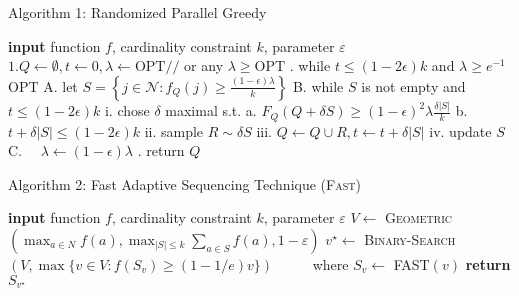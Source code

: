 \documentclass{beamer} %
\begin{document}
\begin{frame}{Algorithm 1: Randomized Parallel Greedy}
\begin{algorithm}[H]
\caption{Randomized Parallel Greedy}
\begin{algorithmic}
    	\STATE \textbf{input} function $f$, cardinality constraint $k$, parameter $\varepsilon$
\STATE$1 . Q \leftarrow \emptyset, t \leftarrow 0, \lambda \leftarrow \mathrm{OPT} / /$ or any $\lambda \geq \mathrm{OPT}$
. while $t \leq(1-2 \epsilon) k$ and $\lambda \geq e^{-1}$ OPT
\STATE \quad A. let $S=\left\{j \in \mathcal{N}: f_{Q}(j) \geq \frac{(1-\epsilon) \lambda}{k}\right\}$
\STATE B. while $S$ is not empty and $t \leq(1-2 \epsilon) k$
\STATE i. chose $\delta$ maximal s.t.
\STATE a. $F_{Q}(Q+\delta S) \geq(1-\epsilon)^{2} \lambda \frac{\delta|S|}{k}$
\STATE b. $t+\delta|S| \leq(1-2 \epsilon) k$
\STATE ii. sample $R \sim \delta S$
\STATE iii. $Q \leftarrow Q \cup R, t \leftarrow t+\delta|S|$
\STATE iv. update $S$
\STATE C. $\quad \lambda \leftarrow(1-\epsilon) \lambda$
. return $Q$
  \end{algorithmic}
  \label{alg:full}
\end{algorithm}


\end{frame}

\begin{frame}{Algorithm 2: Fast Adaptive Sequencing Technique (\textsc{Fast})} 
\begin{algorithm}[H]
\caption{\textsc{Fast-Full}: the full algorithm}
\begin{algorithmic}
    	\STATE \textbf{input} function $f$, cardinality constraint $k$, parameter $\varepsilon$
    	\STATE $V \leftarrow$ \textsc{Geometric}$(\max_{a \in N} f(a), \max_{|S| \leq k} \sum_{a \in S} f(a), 1 - \varepsilon)$
    	\STATE $v^{\star} \leftarrow$ \textsc{Binary-Search}$(V, \max\{v \in V: f(S_v) \geq (1 - 1/e)v\})$
    	\STATE \ \ \ \ \ where $S_v \leftarrow$ \textsc{FAST}$(v)$
    	\STATE \textbf{return} $S_{v^{\star}}$ 
  \end{algorithmic}
  \label{alg:full}
\end{algorithm}
\end{frame}
\end{document}
